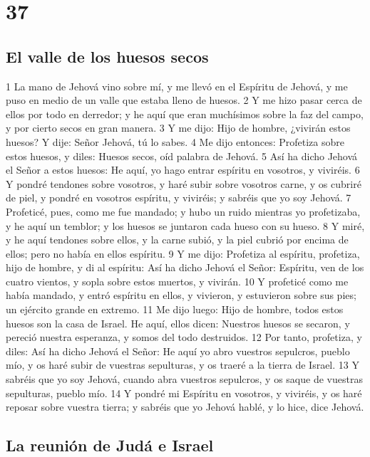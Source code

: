 \chapter{37}

\section*{El valle de los huesos secos}

1 La mano de Jehová vino sobre mí, y me llevó en el Espíritu de Jehová, y me puso en medio de un valle que estaba lleno de huesos.
2 Y me hizo pasar cerca de ellos por todo en derredor; y he aquí que eran muchísimos sobre la faz del campo, y por cierto secos en gran manera.
3 Y me dijo: Hijo de hombre, ¿vivirán estos huesos? Y dije: Señor Jehová, tú lo sabes.
4 Me dijo entonces: Profetiza sobre estos huesos, y diles: Huesos secos, oíd palabra de Jehová.
5 Así ha dicho Jehová el Señor a estos huesos: He aquí, yo hago entrar espíritu en vosotros, y viviréis.
6 Y pondré tendones sobre vosotros, y haré subir sobre vosotros carne, y os cubriré de piel, y pondré en vosotros espíritu, y viviréis; y sabréis que yo soy Jehová.
7 Profeticé, pues, como me fue mandado; y hubo un ruido mientras yo profetizaba, y he aquí un temblor; y los huesos se juntaron cada hueso con su hueso.
8 Y miré, y he aquí tendones sobre ellos, y la carne subió, y la piel cubrió por encima de ellos; pero no había en ellos espíritu.
9 Y me dijo: Profetiza al espíritu, profetiza, hijo de hombre, y di al espíritu: Así ha dicho Jehová el Señor: Espíritu, ven de los cuatro vientos, y sopla sobre estos muertos, y vivirán. 
10 Y profeticé como me había mandado, y entró espíritu en ellos, y vivieron, y estuvieron sobre sus pies; un ejército grande en extremo.
11 Me dijo luego: Hijo de hombre, todos estos huesos son la casa de Israel. He aquí, ellos dicen: Nuestros huesos se secaron, y pereció nuestra esperanza, y somos del todo destruidos.
12 Por tanto, profetiza, y diles: Así ha dicho Jehová el Señor: He aquí yo abro vuestros sepulcros, pueblo mío, y os haré subir de vuestras sepulturas, y os traeré a la tierra de Israel.
13 Y sabréis que yo soy Jehová, cuando abra vuestros sepulcros, y os saque de vuestras sepulturas, pueblo mío.
14 Y pondré mi Espíritu en vosotros, y viviréis, y os haré reposar sobre vuestra tierra; y sabréis que yo Jehová hablé, y lo hice, dice Jehová.

\section*{La reunión de Judá e Israel}

